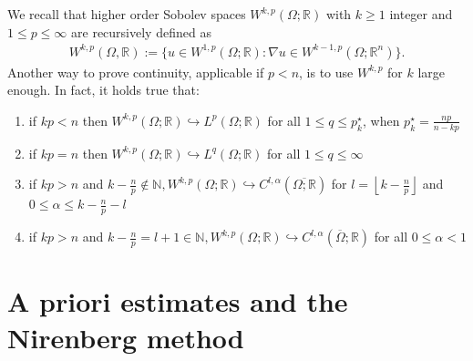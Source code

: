 We recall that higher order Sobolev spaces \(W^{k,p}(\Omega; \mathbb{R})\) with \(k \geq 1\) integer and \(1 \leq p \leq \infty \) are recursively defined as
\begin{gather}
    W^{k,p}(\Omega, \mathbb{R}):= \{ u \in W^{1,p}(\Omega; \mathbb{R}): \nabla u \in W^{k-1,p}(\Omega; \mathbb{R}^{n})\}.
\end{gather}
Another way to prove continuity, applicable if \(p < n\), is to use \(W^{k,p}\) for \(k\) large enough. In fact, it holds true that:
\begin{enumerate}[label= (\arabic*)]
    \item if \(kp<n\) then \(W^{k,p}(\Omega; \mathbb{R})\hookrightarrow L^{p}(\Omega;\mathbb{R})\) for all \(1 \leq q \leq p_{k}^{\star}\), when \(p_{k}^{\star}=\frac{np}{n-kp}\)
    \item if \(kp=n\) then \(W^{k,p}(\Omega; \mathbb{R}) \hookrightarrow L^{q}(\Omega; \mathbb{R}) \) for all \( 1 \leq q\leq \infty \)
    \item if \( kp > n \) and \( k-\frac{n}{p}\notin \mathbb{N}, W^{k,p}(\Omega;\mathbb{R}) \hookrightarrow C^{l,\alpha}(\overline{\Omega; \mathbb{R}})\) for \( l= \left\lfloor k-\frac{n}{p} \right\rfloor  \) and \( 0 \leq \alpha\leq k-\frac{n}{p}-l \)
    \item if \( kp> n \) and \( k-\frac{n}{p}=l+1 \in \mathbb{N}, W^{k,p}(\Omega; \mathbb{R}) \hookrightarrow C^{l,\alpha} (\overline{\Omega}; \mathbb{R})\) for all \( 0 \leq \alpha < 1 \)
\end{enumerate}

\section{A priori estimates and the Nirenberg method}

